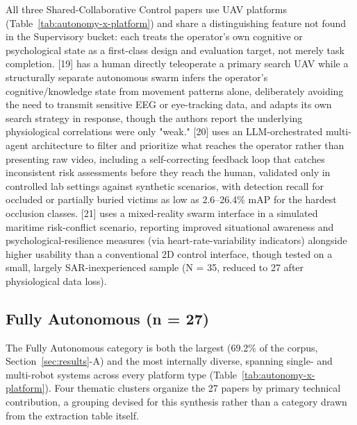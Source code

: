 \documentclass[journal]{IEEEtran}
\begin{document}
All three Shared-Collaborative Control papers use UAV platforms (Table~\ref{tab:autonomy-x-platform}) and share a distinguishing feature not found in the Supervisory bucket: each treats the operator's own cognitive or psychological state as a first-class design and evaluation target, not merely task completion. [19] has a human directly teleoperate a primary search UAV while a structurally separate autonomous swarm infers the operator's cognitive/knowledge state from movement patterns alone, deliberately avoiding the need to transmit sensitive EEG or eye-tracking data, and adapts its own search strategy in response, though the authors report the underlying physiological correlations were only "weak." [20] uses an LLM-orchestrated multi-agent architecture to filter and prioritize what reaches the operator rather than presenting raw video, including a self-correcting feedback loop that catches inconsistent risk assessments before they reach the human, validated only in controlled lab settings against synthetic scenarios, with detection recall for occluded or partially buried victims as low as 2.6--26.4\% mAP for the hardest occlusion classes. [21] uses a mixed-reality swarm interface in a simulated maritime risk-conflict scenario, reporting improved situational awareness and psychological-resilience measures (via heart-rate-variability indicators) alongside higher usability than a conventional 2D control interface, though tested on a small, largely SAR-inexperienced sample (N = 35, reduced to 27 after physiological data loss).

\subsection{Fully Autonomous (n = 27)}

The Fully Autonomous category is both the largest (69.2\% of the corpus, Section~\ref{sec:results}-A) and the most internally diverse, spanning single- and multi-robot systems across every platform type (Table~\ref{tab:autonomy-x-platform}). Four thematic clusters organize the 27 papers by primary technical contribution, a grouping devised for this synthesis rather than a category drawn from the extraction table itself.
\end{document}
